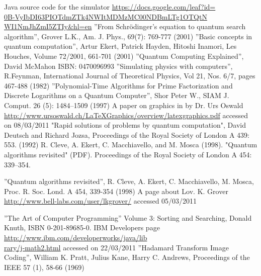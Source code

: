 \documentclass[12pt]{report}
\begin{document}
\begin{thebibliography}{99999}
Java source code for the simulator \href{https://docs.google.com/leaf?id=0B-VyIbDI63PIOTdmZTk4NWItMDMzMC00NDBmLTg1OTQtNWI1NmJhZmI5ZTIy&hl=en}{https://docs.google.com/leaf?id=\\0B-VyIbDI63PIOTdmZTk4NWItMDMzMC00NDBmLTg1OTQtN\\WI1NmJhZmI5ZTIy\&hl=en}
''From Schrödinger's equation to quantum search algorithm'', Grover L.K., Am. J. Phys., 69(7): 769-777 (2001)
''Basic concepts in quantum computation'', Artur Ekert, Patrick Hayden, Hitoshi Inamori, Les Houches, Volume 72/2001, 661-701 (2001)
''Quantum Computing Explained'', David McMahon  ISBN: 0470096993
''Simulating physics with computers'', R.Feynman, International Journal of Theoretical Physics, Vol 21, Nos. 6/7, pages 467-488 (1982) 
''Polynomial-Time Algorithms for Prime Factorization and Discrete Logarithms on a Quantum Computer'', Shor Peter W., SIAM J. Comput. 26 (5): 1484–1509  (1997)
A paper on graphics in \LaTeXe{} by Dr. Urs Oswald \href{http://www.ursoswald.ch/LaTeXGraphics/overview/latexgraphics.pdf}{http://www.ursoswald.ch/LaTeXGraphics/overview/latexgraphics.pdf} accessed on 08/03/2011
"Rapid solutions of problems by quantum computation", David Deutsch and Richard Jozsa, Proceedings of the Royal Society of London A 439: 553. (1992)
R. Cleve, A. Ekert, C. Macchiavello, and M. Mosca (1998). "Quantum algorithms revisited" (PDF). Proceedings of the Royal Society of London A 454: 339–354.

''Quantum algorithms revisited'', R. Cleve, A. Ekert, C. Macchiavello, M. Mosca, Proc. R. Soc. Lond. A 454, 339-354 (1998)
A page about Lov. K. Grover \href{http://www.bell-labs.com/user/lkgrover/}{http://www.bell-labs.com/user/lkgrover/} accessed 05/03/2011


''The Art of Computer Programming'' Volume 3: Sorting and Searching, Donald Knuth, ISBN 0-201-89685-0.
IBM Developers page
\href{http://www.ibm.com/developerworks/java/library/j-math2.html}{http://www.ibm.com/developerworks/java/lib\\rary/j-math2.html} accessed on 22/03/2011
''Hadamard Transform Image Coding'', William K. Pratt, Julius Kane, Harry C. Andrews, Proceedings of the IEEE 57 (1), 58-66 (1969)



\end{thebibliography}
\end{document}
